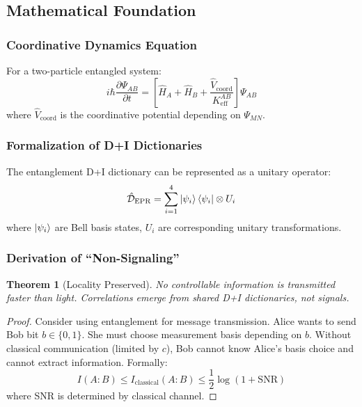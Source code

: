 \documentclass[11pt,a4paper]{article}
\newtheorem{theorem}{Theorem}
\begin{document}
	\subsection{Mathematical Foundation}
	\label{subsec:math-foundation}
	
	\subsubsection{Coordinative Dynamics Equation}
	For a two-particle entangled system:
	\begin{equation}
		i\hbar \frac{\partial \Psi_{AB}}{\partial t} = \left[ \hat{H}_A + \hat{H}_B + \frac{\hat{V}_{\text{coord}}}{K_{\mathrm{eff}}^{AB}} \right] \Psi_{AB}
	\end{equation}
	where $\hat{V}_{\text{coord}}$ is the coordinative potential depending on $\Psi_{MN}$.
	
	\subsubsection{Formalization of D+I Dictionaries}
	The entanglement D+I dictionary can be represented as a unitary operator:
	\begin{equation}
		\hat{\mathcal{D}}_{\text{EPR}} = \sum_{i=1}^{4} \ket{\psi_i}\bra{\psi_i} \otimes U_i
	\end{equation}
	where $\ket{\psi_i}$ are Bell basis states, $U_i$ are corresponding unitary transformations.
	
	\subsubsection{Derivation of ``Non-Signaling''}
	\begin{theorem}[Locality Preserved]
		No controllable information is transmitted faster than light. Correlations emerge from shared D+I dictionaries, not signals.
	\end{theorem}
	
	\begin{proof}
		Consider using entanglement for message transmission. Alice wants to send Bob bit $b \in \{0,1\}$. She must choose measurement basis depending on $b$. Without classical communication (limited by $c$), Bob cannot know Alice's basis choice and cannot extract information. Formally:
		\begin{equation}
			I(A:B) \leq I_{\text{classical}}(A:B) \leq \frac{1}{2} \log(1 + \text{SNR})
		\end{equation}
		where SNR is determined by classical channel.
	\end{proof}
	
\end{document}
